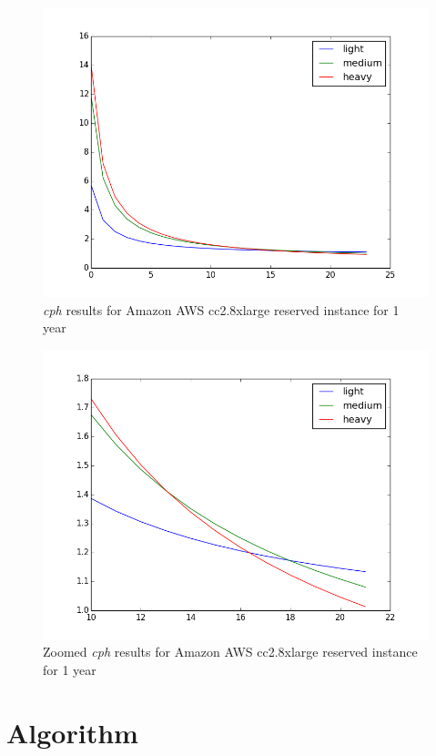 \documentclass[]{final_report}
\begin{document}
\begin{figure}[H]
	\includegraphics[width=\linewidth]{figures/cc2_8xlarge}
	\caption{\textit{cph} results for Amazon AWS cc2.8xlarge reserved instance for 1 year~\cite{AWS:2014}}
	\label{fig:cc2_8xlarge}
\end{figure}

\begin{figure}[H]
	\includegraphics[width=\linewidth]{figures/cph_cc2_8xlarge_zoom}
	\caption{Zoomed \textit{cph} results for Amazon AWS cc2.8xlarge reserved instance for 1 year~\cite{AWS:2014}}
	\label{fig:cph_cc2_8xlarge_zoom}
\end{figure}


\section{Algorithm}
\end{document}
